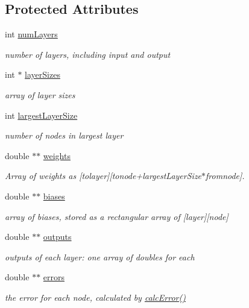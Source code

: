 \subsection*{Protected Attributes}
\begin{DoxyCompactItemize}
\item 
int \hyperlink{classBPNet_aaabccfce85225083b21b02a3b3065c81}{num\+Layers}
\begin{DoxyCompactList}\small\item\em number of layers, including input and output \end{DoxyCompactList}\item 
int $\ast$ \hyperlink{classBPNet_a9f59cc3cc5e0972d473e26a4fb47b5c6}{layer\+Sizes}
\begin{DoxyCompactList}\small\item\em array of layer sizes \end{DoxyCompactList}\item 
int \hyperlink{classBPNet_a60c06f158b82c2ee8a95df4f0c46235d}{largest\+Layer\+Size}
\begin{DoxyCompactList}\small\item\em number of nodes in largest layer \end{DoxyCompactList}\item 
double $\ast$$\ast$ \hyperlink{classBPNet_aca57e8583a315a709a27e4dffeefd493}{weights}
\begin{DoxyCompactList}\small\item\em Array of weights as \mbox{[}tolayer\mbox{]}\mbox{[}tonode+largest\+Layer\+Size$\ast$fromnode\mbox{]}. \end{DoxyCompactList}\item 
double $\ast$$\ast$ \hyperlink{classBPNet_a2e41caf79f495792d03395b0c3eea560}{biases}
\begin{DoxyCompactList}\small\item\em array of biases, stored as a rectangular array of \mbox{[}layer\mbox{]}\mbox{[}node\mbox{]} \end{DoxyCompactList}\item 
double $\ast$$\ast$ \hyperlink{classBPNet_af2839f081e9f715b207fcc89789bfd0a}{outputs}
\begin{DoxyCompactList}\small\item\em outputs of each layer\+: one array of doubles for each \end{DoxyCompactList}\item 
double $\ast$$\ast$ \hyperlink{classBPNet_a6b60b49ea0c157bbe4d785f74fa3f208}{errors}
\begin{DoxyCompactList}\small\item\em the error for each node, calculated by \hyperlink{classBPNet_a98e5db7247f0358375c27d1bb091f6ab}{calc\+Error()} \end{DoxyCompactList}\item 

\end{DoxyCompactItemize}
